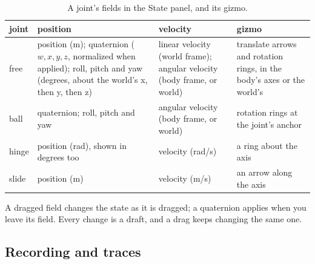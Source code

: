 \begin{table}[t]
\centering
\caption{A joint's fields in the State panel, and its gizmo.}
\label{tab:joints}
\small
\begin{tabularx}{\linewidth}{@{}L{12mm}L{50mm}L{40mm}Y@{}}
\toprule
joint & position & velocity & gizmo \\
\midrule
free & position (m); quaternion ($w, x, y, z$, normalized when applied); roll, pitch and yaw (degrees, about the world's x, then y, then z) & linear velocity (world frame); angular velocity (body frame, or world) & translate arrows and rotation rings, in the body's axes or the world's \\
ball & quaternion; roll, pitch and yaw & angular velocity (body frame, or world) & rotation rings at the joint's anchor \\
hinge & position (rad), shown in degrees too & velocity (rad/s) & a ring about the axis \\
slide & position (m) & velocity (m/s) & an arrow along the axis \\
\bottomrule
\end{tabularx}
\end{table}

A dragged field changes the state as it is dragged; a quaternion applies when you leave its field. Every change is a draft, and a drag keeps changing the same one.

\subsection{Recording and traces}\label{sec:recording}

